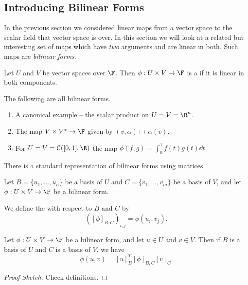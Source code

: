 \subsection{Introducing Bilinear Forms}

In the previous section we considered linear maps from a vector space to the scalar field that vector space is over. In this section we will look at a related but interesting set of maps which have \emph{two} arguments and are linear in both.
Such maps are \emph{bilinear forms}.

\begin{definition}
    Let $U$ and $V$ be vector spaces over $\F$. Then $\phi: U \times V \rightarrow \F$ is a  if it is linear in both components.
\end{definition}

\begin{example}
    The following are all bilinear forms.
    \begin{enumerate}[label=(\roman*)]
        \item A canonical example -- the scalar product on $U = V = \R^n$.
        \item The map $V \times V^* \rightarrow \F$ given by $(v, \alpha) \mapsto \alpha(v)$.
        \item For $U = V = \mathcal{C}([0, 1],\R)$ the map
        $
        \phi(f, g) = \int_0^1 f(t) g(t) \dd t.
        $
    \end{enumerate}
\end{example}

There is a standard representation of bilinear forms using matrices.

\begin{definition}
    Let $B = \{u_1, \dots, u_n\}$ be a basis of $U$ and $C = \{v_1, \dots, v_m\}$ be a basis of $V$, and let $\phi: U \times V \rightarrow \F$ be a bilinear form.
    
    We define the  with respect to $B$ and $C$ by
    $$
    ([\phi]_{B, C})_{i, j} = \phi(u_i, v_j). 
    $$
\end{definition}

\begin{lemma}
    Let $\phi: U \times V \rightarrow \F$ be a bilinear form, and let $u \in U$ and $v \in V$. Then if $B$ is a basis of $U$ and $C$ is a basis of $V$, we have
    $$
    \phi(u, v) = [u]_B^T [\phi]_{B, C} [v]_C.
    $$
\end{lemma}
\begin{proof}[Proof Sketch]
    Check definitions.
\end{proof}

